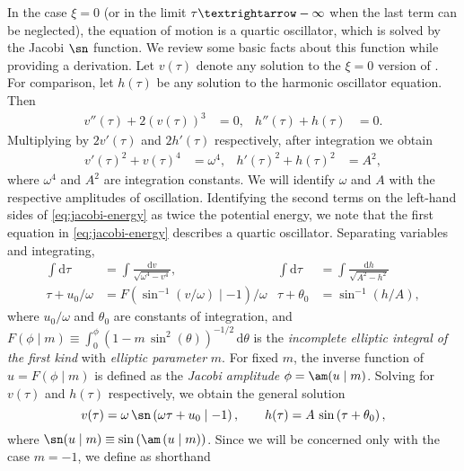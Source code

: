 In the case $\xi=0$ (or in the limit $\tau\textrightarrow-\infty$ when the last term can be neglected), the equation of motion  is a quartic oscillator, which is solved by the Jacobi \texorpdfstring{$\sn$}{sn} function. We review some basic facts about this function while providing a derivation. Let $v(\tau)$ denote any solution to the $\xi=0$ version of . For comparison, let $h(\tau)$ be any solution to the harmonic oscillator equation. Then 
\begin{align}
v''(\tau)+2\left(v(\tau)\right)^{3} & =0, & h''(\tau)+h(\tau) & =0.\label{eq:jacobi-eom}
\end{align}
 Multiplying  by $2v'(\tau)$ and $2h'(\tau)$ respectively, after integration we obtain 
\begin{align}
v'(\tau)^{2}+v(\tau)^{4} & =\omega^{4}, & h'(\tau)^{2}+h(\tau)^{2} & =A^{2},\label{eq:jacobi-energy}
\end{align}
 where $\omega^{4}$ and $A^{2}$ are integration constants. We will identify $\omega$ and $A$ with the respective amplitudes of oscillation. Identifying the second terms on the left-hand sides of \eqref{eq:jacobi-energy} as twice the potential energy, we note that the first equation in \eqref{eq:jacobi-energy} describes a quartic oscillator. Separating variables and integrating, 
\begin{align}
\int\mathrm{d}\tau & =\int\frac{\mathrm{d}v}{\sqrt{\omega^{4}-v^{4}}}, & \int\mathrm{d}\tau & =\int\frac{\mathrm{d}h}{\sqrt{A^{2}-h^{2}}}\nonumber \\
\tau+u_{0}/\omega & =F\left(\sin^{-1}\left(v/\omega\right)\mid-1\right)/\omega & \tau+\theta_{0} & =\sin^{-1}\left(h/A\right),\label{eq:elliptic-F}
\end{align}
 where $u_{0}/\omega$ and $\theta_{0}$ are constants of integration, and $F(\phi\mid m)\equiv\int_{0}^{\phi}\left(1-m\,\sin^{2}(\theta)\right)^{-1/2}\,\mathrm{d}\theta$ is the \emph{incomplete elliptic integral of the first kind} with \emph{elliptic parameter} $m$. For fixed $m$, the inverse function of $u=F(\phi\mid m)$ is defined as the \emph{Jacobi amplitude} $\phi=\am(u\mid m)$. Solving for $v(\tau)$ and $h(\tau)$ respectively, we obtain the general solution 
\begin{equation}
v(\tau)=\omega\,\sn\left(\omega\tau+u_{0}\mid-1\right),\qquad h(\tau)=A\,\sin\left(\tau+\theta_{0}\right),\label{eq:quartic-solution}
\end{equation}
 where $\sn(u\mid m)\equiv\sin\left(\am\left(u\mid m\right)\right)$. Since we will be concerned only with the case $m=-1$, we define as shorthand
